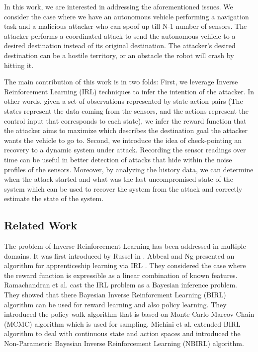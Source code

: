 \documentclass[conference]{IEEEtran}
\begin{document}
In this work, we are interested in addressing the aforementioned issues. We consider the case where we have an autonomous vehicle performing a navigation task and a malicious attacker who can spoof up till N-1 number of sensors. The attacker performs a coordinated attack to send the autonomous vehicle to a desired destination instead of its original destination. The attacker's desired destination can be a hostile territory, or an obstacle the robot will crash by hitting it.

The main contribution of this work is in two folds: First, we leverage Inverse Reinforcement Learning (IRL) techniques to infer the intention of the attacker. In other words, given a set of observations represented by state-action pairs (The states represent the data coming from the sensors, and the actions represent the control input that corresponds to each state), we infer the reward function that the attacker aims to maximize which describes the destination goal the attacker wants the vehicle to go to. Second, we introduce the idea of check-pointing an recovery to a dynamic system under attack. Recording the sensor readings over time can be useful in better detection of attacks that hide within the noise profiles of the sensors. Moreover, by analyzing the history data, we can determine when the attack started and what was the last uncompromised state of the system which can be used to recover the system from the attack and correctly estimate the state of the system.

\subsection{Related Work}\label{subsec:related}
The problem of Inverse Reinforcement Learning has been addressed in multiple domains. It was first introduced by Russel in \cite{Ng2000}. Abbeal and Ng presented an algorithm for apprenticeship learning via IRL  \cite{Abbeel2004a}. They considered the case where the reward function is expressible as a linear combination of known features. Ramachandran et al. \cite{Ramachandran2007} cast the IRL problem as a Bayesian inference problem. They showed that there Bayesian Inverse Reinforcment Learning (BIRL) algorithm can be used for reward learning and also policy learning. They introduced the policy walk algorithm that is based on Monte Carlo Marcov Chain (MCMC) algorithm which is used for sampling. Michini et al. \cite{Michini2015} extended BIRL algorithm to deal with continuous state and action spaces and introduced the Non-Parametric Bayesian Inverse Reinforcement Learning (NBIRL) algorithm.
\end{document}
